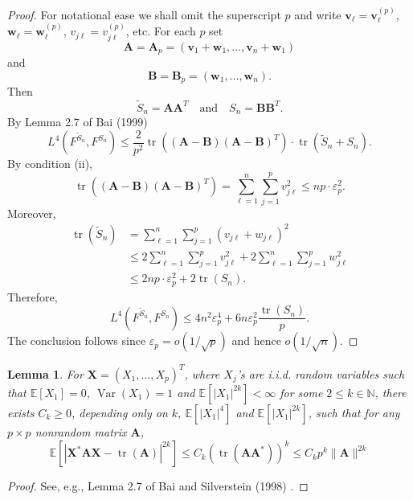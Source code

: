 \documentclass[a4paper,11pt]{book}
\theoremstyle{plain}
\newtheorem{lmm}[thm]{Lemma}
\theoremstyle{definition}
\newcommand{\ME}{\mathbb{E}}
\newcommand{\MN}{\mathbb{N}}
\newcommand{\Var}{\operatorname{Var}}
\newcommand{\tr}{\operatorname{tr}}
\begin{document}
    \begin{proof}
    	For notational ease we shall omit the superscript $p$ and write $\mathbf{v}_\ell = \mathbf{v}_\ell^{(p)}$, $\mathbf{w}_\ell = \mathbf{w}_\ell^{(p)}$, $v_{j\ell} = v_{j\ell}^{(p)}$, etc. For each $p$ set 
    	\[ \mathbf{A} = \mathbf{A}_p = (\mathbf{v}_1 + \mathbf{w}_1, \dots, \mathbf{v}_n + \mathbf{w}_1) \]
    	and
    	\[ \mathbf{B} = \mathbf{B}_p = (\mathbf{w}_1, \dots,  \mathbf{w}_n). \]
    	Then
    	\[ \widetilde{S}_n = \mathbf{AA}^T \quad \text{and} \quad S_n = \mathbf{BB}^T. \]
    	By Lemma 2.7 of Bai (1999)
    	\[L^4(F^{\widetilde{S}_n}, F^{S_n}) \leq \frac{2}{p^2} \tr((\mathbf{A}-\mathbf{B})(\mathbf{A}-\mathbf{B})^T) \cdot \tr(\widetilde{S}_n + S_n). \]
    	By condition (ii),
    	\[ \tr((\mathbf{A}-\mathbf{B})(\mathbf{A}-\mathbf{B})^T)  = \sum_{\ell=1}^{n} \sum_{j=1}^{p} v_{j\ell}^2 \leq np \cdot \varepsilon_p^2. \]
    	Moreover,
    	\[
    	\begin{aligned}
    	\tr(\widetilde{S}_n) &= \sum_{\ell=1}^{n} \sum_{j=1}^{p} (v_{j\ell} + w_{j\ell})^2 \\
    	& \leq 2 \sum_{\ell=1}^{n} \sum_{j=1}^{p} v_{j\ell}^2 + 2\sum_{\ell=1}^{n} \sum_{j=1}^{p} w_{j\ell}^2 \\
    	& \leq 2np \cdot \varepsilon_p^2 + 2 \tr(S_n).
    	\end{aligned}
    	 \]
    	 Therefore,
    	 \[L^4(F^{\widetilde{S}_n}, F^{S_n}) \leq 4n^2\varepsilon_p^4 + 6n\varepsilon_p^2 \frac{\tr(S_n)}{p}. \]
    	 The conclusion follows since $\varepsilon_p = o(1/\sqrt{p})$ and hence $o(1/\sqrt{n})$.
    \end{proof}
    
    \begin{lmm} \label{lmm 9}
    	For $\mathbf{X} = (X_1, \dots, X_p)^T$, where $X_j$'s are i.i.d. random variables such that $\ME[X_1] = 0$, $\Var(X_1) = 1$ and $\ME[|X_1|^{2k}] < \infty$ for some $2 \leq k \in \MN$, there exists $C_k \geq 0$, depending only on $k$, $\ME[|X_1|^4]$ and $\ME[|X_1|^{2k}]$, such that for any $p \times p$ nonrandom matrix $\mathbf{A}$,
    	\[ \ME[|\mathbf{X}^* \mathbf{A} \mathbf{X} - \tr(\mathbf{A}) |^{2k}] \leq C_k(\tr(\mathbf{AA}^*))^k \leq C_k p^k \|\mathbf{A} \|^{2k}  \]
    \end{lmm}
    \begin{proof}
    	See, e.g., Lemma 2.7 of Bai and Silverstein (1998) \cite{BaiSilverstein}.
    \end{proof}
    
\end{document}
